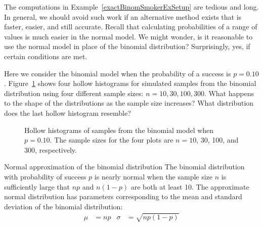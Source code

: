 The computations in Example~\ref{exactBinomSmokerExSetup}
are tedious and long.
In general, we should avoid such work if an alternative method
exists that is faster, easier, and still accurate.
Recall that calculating probabilities of a range of values
is much easier in the normal model.
We might wonder, is it reasonable to use the normal model
in place of the binomial distribution?
Surprisingly, yes, if certain conditions are met.

\begin{exercisewrap}
\begin{nexercise}
Here we consider the binomial model when the probability
of a success is $p = 0.10$.
Figure~\ref{fourBinomialModelsShowingApproxToNormal}
shows four hollow histograms for simulated samples from
the binomial distribution using four different sample sizes:
$n = 10, 30, 100, 300$.
What happens to the shape of the distributions as the sample
size increases?
What distribution does the last hollow histogram
resemble?\footnotemark{}
\end{nexercise}
\end{exercisewrap}

\begin{figure}[h]
  \centering
  \caption{Hollow histograms of samples from the binomial
      model when $p = 0.10$.
      The sample sizes for the four plots are
      $n = 10$, 30, 100, and 300, respectively.}
  \label{fourBinomialModelsShowingApproxToNormal}
\end{figure}

\begin{onebox}{Normal approximation of the binomial distribution}
  The binomial distribution with probability of success
  $p$ is nearly normal when the sample size $n$ is
  sufficiently large that $np$ and $n(1-p)$ are both
  at least 10.
  The approximate normal distribution has parameters
  corresponding to the mean and standard deviation of
  the binomial distribution:\vspace{-1.5mm}
  \begin{align*}
  \mu &= np
      &\sigma& = \sqrt{np(1 - p)}
  \end{align*}
\end{onebox}

